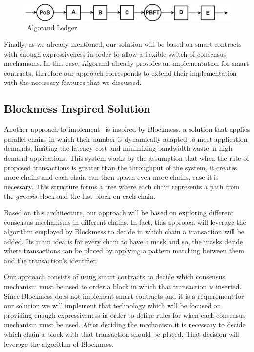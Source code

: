\begin{figure}[h]
    \centering
    \includegraphics[scale=0.5]{Chapters/Figures/drawio/hyflexchain/algorand/hyflexchain_algorand_pluggabble_consensus_chain.png}
    \caption{\mysystem~Algorand Ledger}
    \label{fig:hyflexchain_ledger_algorand}
\end{figure}

Finally, as we already mentioned, our solution will be based on smart contracts with enough expressiveness in order to allow a flexible switch of consensus mechanisms. In this case, Algorand already provides an implementation for smart contracts, therefore our approach corresponds to extend their implementation with the necessary features that we discussed.


\subsection{Blockmess Inspired Solution}

Another approach to implement \mysystem~is inspired by Blockmess, a solution that applies parallel chains in which their number is dynamically adapted to meet application demands, limiting the latency cost and minimizing bandwidth waste in high demand applications. This system works by the assumption that when the rate of proposed transactions is greater than the throughput of the system, it creates more chains and each chain can then spawn even more chains, case it is necessary. This structure forms a tree where each chain represents a path from the \textit{genesis} block and the last block on each chain.

Based on this architecture, our approach will be based on exploring different consensus mechanisms in different chains. In fact, this approach will leverage the algorithm employed by Blockmess to decide in which chain a transaction will be added. Its main idea is for every chain to have a mask and so, the masks decide where transactions can be placed by applying a pattern matching between them and the transaction's identifier.

Our approach consists of using smart contracts to decide which consensus mechanism must be used to order a block in which that transaction is inserted. Since Blockmess does not implement smart contracts and it is a requirement for our solution we will implement that technology which will be focused on providing enough expressiveness in order to define rules for when each consensus mechanism must be used. After deciding the mechanism it is necessary to decide which chain a block with that transaction should be placed. That decision will leverage the algorithm of Blockmess.

